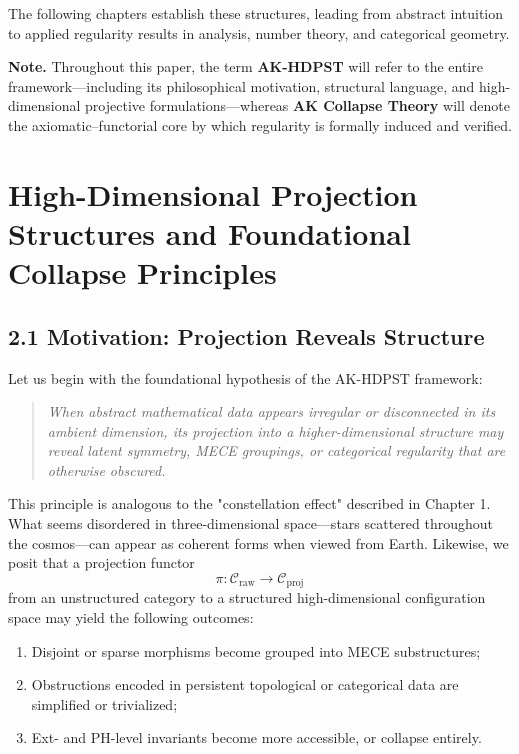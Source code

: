\documentclass[11pt]{article}
\begin{document}
The following chapters establish these structures,  
leading from abstract intuition to applied regularity results  
in analysis, number theory, and categorical geometry.

\vspace{1em}
\noindent\textbf{Note.}  
Throughout this paper, the term \textbf{AK-HDPST} will refer to the entire framework—including its philosophical motivation, structural language,  
and high-dimensional projective formulations—whereas \textbf{AK Collapse Theory} will denote the axiomatic–functorial core  
by which regularity is formally induced and verified.



\section{High-Dimensional Projection Structures and Foundational Collapse Principles}

\subsection*{2.1 Motivation: Projection Reveals Structure}

Let us begin with the foundational hypothesis of the AK-HDPST framework:

\begin{quote}
\textit{
When abstract mathematical data appears irregular or disconnected in its ambient dimension,  
its projection into a higher-dimensional structure may reveal latent symmetry, MECE groupings,  
or categorical regularity that are otherwise obscured.
}
\end{quote}

This principle is analogous to the "constellation effect" described in Chapter 1.  
What seems disordered in three-dimensional space—stars scattered throughout the cosmos—can appear as coherent forms when viewed from Earth.  
Likewise, we posit that a projection functor  
\[
\pi : \mathcal{C}_{\text{raw}} \longrightarrow \mathcal{C}_{\text{proj}}
\]
from an unstructured category to a structured high-dimensional configuration space  
may yield the following outcomes:

\begin{enumerate}
  \item Disjoint or sparse morphisms become grouped into MECE substructures;
  \item Obstructions encoded in persistent topological or categorical data are simplified or trivialized;
  \item Ext- and PH-level invariants become more accessible, or collapse entirely.
\end{enumerate}
\end{document}
